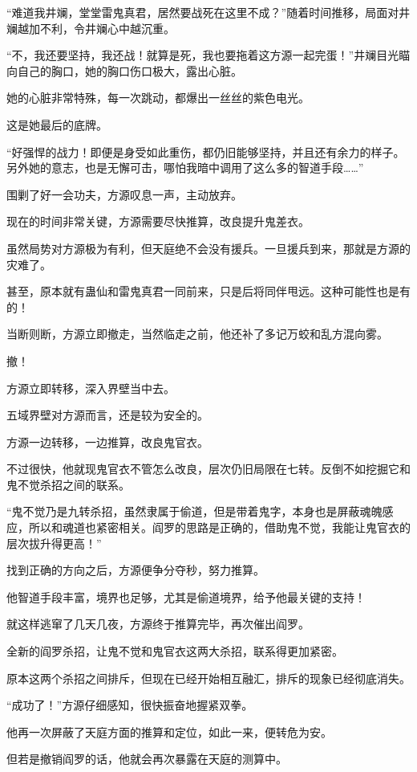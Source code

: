 \begin{this_body}
“难道我井斓，堂堂雷鬼真君，居然要战死在这里不成？”随着时间推移，局面对井斓越加不利，令井斓心中越沉重。

“不，我还要坚持，我还战！就算是死，我也要拖着这方源一起完蛋！”井斓目光瞄向自己的胸口，她的胸口伤口极大，露出心脏。

她的心脏非常特殊，每一次跳动，都爆出一丝丝的紫色电光。

这是她最后的底牌。

“好强悍的战力！即便是身受如此重伤，都仍旧能够坚持，并且还有余力的样子。另外她的意志，也是无懈可击，哪怕我暗中调用了这么多的智道手段……”

围剿了好一会功夫，方源叹息一声，主动放弃。

现在的时间非常关键，方源需要尽快推算，改良提升鬼差衣。

虽然局势对方源极为有利，但天庭绝不会没有援兵。一旦援兵到来，那就是方源的灾难了。

甚至，原本就有蛊仙和雷鬼真君一同前来，只是后将同伴甩远。这种可能性也是有的！

当断则断，方源立即撤走，当然临走之前，他还补了多记万蛟和乱方混向雾。

撤！

方源立即转移，深入界壁当中去。

五域界壁对方源而言，还是较为安全的。

方源一边转移，一边推算，改良鬼官衣。

不过很快，他就现鬼官衣不管怎么改良，层次仍旧局限在七转。反倒不如挖掘它和鬼不觉杀招之间的联系。

“鬼不觉乃是九转杀招，虽然隶属于偷道，但是带着鬼字，本身也是屏蔽魂魄感应，所以和魂道也紧密相关。阎罗的思路是正确的，借助鬼不觉，我能让鬼官衣的层次拔升得更高！”

找到正确的方向之后，方源便争分夺秒，努力推算。

他智道手段丰富，境界也足够，尤其是偷道境界，给予他最关键的支持！

就这样逃窜了几天几夜，方源终于推算完毕，再次催出阎罗。

全新的阎罗杀招，让鬼不觉和鬼官衣这两大杀招，联系得更加紧密。

原本这两个杀招之间排斥，但现在已经开始相互融汇，排斥的现象已经彻底消失。

“成功了！”方源仔细感知，很快振奋地握紧双拳。

他再一次屏蔽了天庭方面的推算和定位，如此一来，便转危为安。

但若是撤销阎罗的话，他就会再次暴露在天庭的测算中。


\end{this_body}
